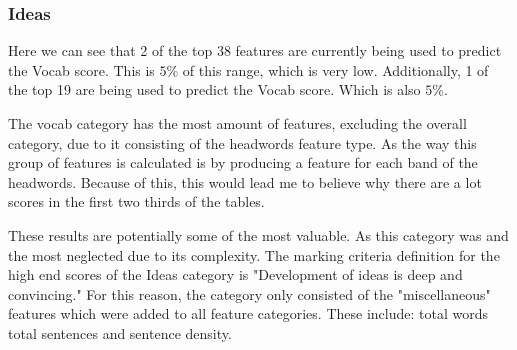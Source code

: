 \subsubsection{Ideas}

Here we can see that 2 of the top 38 features are currently being used to predict the Vocab score. This is $5\%$ of this range, which is very low. Additionally, 1 of the top 19 are being used to predict the Vocab score. Which is also $5\%$.

The vocab category has the most amount of features, excluding the overall category, due to it consisting of the headwords feature type. As the way this group of features is calculated is by producing a feature for each band of the headwords. Because of this, this would lead me to believe why there are a lot scores in the first two thirds of the tables.

These results are potentially some of the most valuable. As this category was and the most neglected due to its complexity. The marking criteria definition for the high end scores of the Ideas category is "Development of ideas is deep and convincing." For this reason, the category only consisted of the "miscellaneous" features which were added to all feature categories. These include: total words total sentences and sentence density. 

